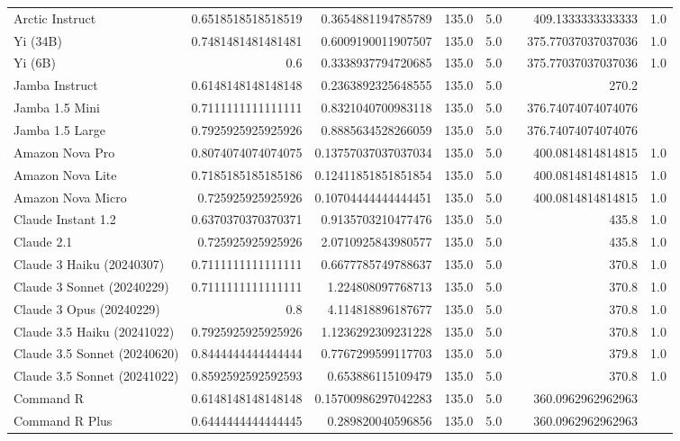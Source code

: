 \begin{table}[htp]
{\begin{tabular}{lrrrrrrr}
Arctic Instruct & 0.6518518518518519 & 0.3654881194785789 & 135.0 & 5.0 &  & 409.1333333333333 & 1.0 \\
Yi (34B) & 0.7481481481481481 & 0.6009190011907507 & 135.0 & 5.0 &  & 375.77037037037036 & 1.0 \\
Yi (6B) & 0.6 & 0.3338937794720685 & 135.0 & 5.0 &  & 375.77037037037036 & 1.0 \\
Jamba Instruct & 0.6148148148148148 & 0.2363892325648555 & 135.0 & 5.0 &  & 270.2 &  \\
Jamba 1.5 Mini & 0.7111111111111111 & 0.8321040700983118 & 135.0 & 5.0 &  & 376.74074074074076 &  \\
Jamba 1.5 Large & 0.7925925925925926 & 0.8885634528266059 & 135.0 & 5.0 &  & 376.74074074074076 &  \\
Amazon Nova Pro & 0.8074074074074075 & 0.13757037037037034 & 135.0 & 5.0 &  & 400.0814814814815 & 1.0 \\
Amazon Nova Lite & 0.7185185185185186 & 0.12411851851851854 & 135.0 & 5.0 &  & 400.0814814814815 & 1.0 \\
Amazon Nova Micro & 0.725925925925926 & 0.10704444444444451 & 135.0 & 5.0 &  & 400.0814814814815 & 1.0 \\
Claude Instant 1.2 & 0.6370370370370371 & 0.9135703210477476 & 135.0 & 5.0 &  & 435.8 & 1.0 \\
Claude 2.1 & 0.725925925925926 & 2.0710925843980577 & 135.0 & 5.0 &  & 435.8 & 1.0 \\
Claude 3 Haiku (20240307) & 0.7111111111111111 & 0.6677785749788637 & 135.0 & 5.0 &  & 370.8 & 1.0 \\
Claude 3 Sonnet (20240229) & 0.7111111111111111 & 1.224808097768713 & 135.0 & 5.0 &  & 370.8 & 1.0 \\
Claude 3 Opus (20240229) & 0.8 & 4.114818896187677 & 135.0 & 5.0 &  & 370.8 & 1.0 \\
Claude 3.5 Haiku (20241022) & 0.7925925925925926 & 1.1236292309231228 & 135.0 & 5.0 &  & 370.8 & 1.0 \\
Claude 3.5 Sonnet (20240620) & 0.8444444444444444 & 0.7767299599117703 & 135.0 & 5.0 &  & 379.8 & 1.0 \\
Claude 3.5 Sonnet (20241022) & 0.8592592592592593 & 0.653886115109479 & 135.0 & 5.0 &  & 370.8 & 1.0 \\
Command R & 0.6148148148148148 & 0.15700986297042283 & 135.0 & 5.0 &  & 360.0962962962963 &  \\
Command R Plus & 0.6444444444444445 & 0.289820040596856 & 135.0 & 5.0 &  & 360.0962962962963 &  \\

\end{tabular}}
\end{table}
